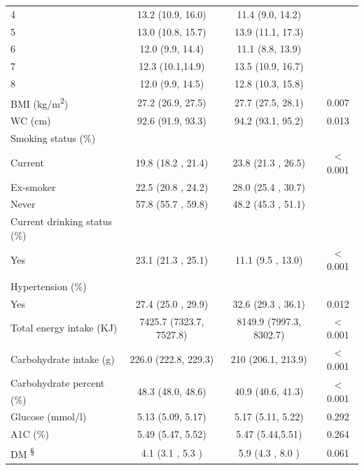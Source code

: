 \begin{table}[h]
\begin{tabular}[t]{lccc}
			\hspace{1em}4 & 13.2 (10.9, 16.0) & 11.4 (9.0, 14.2) & \\
			\hspace{1em}5 & 13.0 (10.8, 15.7) & 13.9 (11.1, 17.3) & \\
			\hspace{1em}6 & 12.0 (9.9, 14.4) & 11.1 (8.8, 13.9) & \\
			\hspace{1em}7 & 12.3 (10.1,14.9) & 13.5 (10.9, 16.7) & \\
			\hspace{1em}8 & 12.0 (9.9, 14.5) & 12.8 (10.3, 15.8) & \\
			BMI (kg/m\textsuperscript{2}) & 27.2 (26.9, 27.5) & 27.7 (27.5, 28.1) & 0.007\\
			WC (cm) & 92.6 (91.9, 93.3) & 94.2 (93.1, 95.2) & 0.013\\
			Smoking status (\%) &  &  & \\
			\hspace{1em}Current & 19.8  (18.2 , 21.4) & 23.8 (21.3 , 26.5) & < 0.001\\
			\hspace{1em}Ex-smoker & 22.5  (20.8 , 24.2) & 28.0 (25.4 , 30.7) & \\
			\hspace{1em}Never & 57.8  (55.7 , 59.8) & 48.2 (45.3 , 51.1) & \\
			Current drinking status (\%) &  &  & \\
			\hspace{1em}Yes & 23.1  (21.3 , 25.1) & 11.1  (9.5 , 13.0) & < 0.001\\
			Hypertension (\%) \textsuperscript{\dag} &  &  & \\
			\hspace{1em}Yes & 27.4  (25.0 , 29.9) & 32.6  (29.3 , 36.1) & 0.012\\
			Total energy intake (KJ) & 7425.7 (7323.7, 7527.8) & 8149.9 (7997.3, 8302.7) & < 0.001\\
			Carbohydrate intake (g) & 226.0 (222.8, 229.3) & 210 (206.1, 213.9) & < 0.001\\
			Carbohydrate
			percent (\%) \textsuperscript{\ddag} & 48.3 (48.0, 48.6) & 40.9 (40.6, 41.3) & < 0.001\\
			Glucose (mmol/l) & 5.13 (5.09, 5.17) & 5.17 (5.11, 5.22) & 0.292\\
			A1C (\%) & 5.49 (5.47, 5.52) & 5.47 (5.44,5.51) & 0.264\\
			DM \textsuperscript{\S} & 4.1  (3.1 , 5.3 ) & 5.9  (4.3 , 8.0 ) & 0.061\\

\end{tabular}
\end{table}
